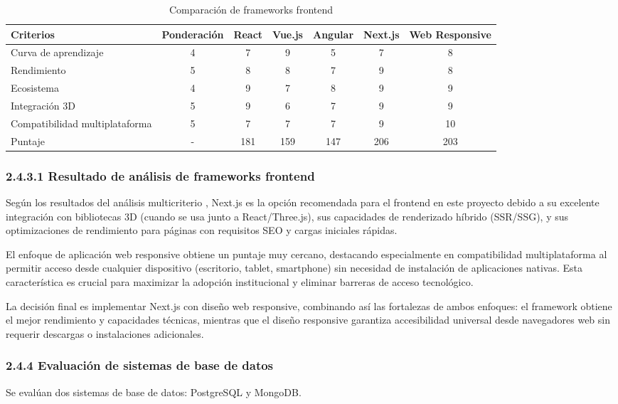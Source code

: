 \begin{table}[ht]
\centering
\caption{Comparación de frameworks frontend}
\begin{tabular}{l c c c c c c}
\hline
Criterios & Ponderación & React & Vue.js & Angular & Next.js & Web Responsive \\
\hline
Curva de aprendizaje & 4 & 7 & 9 & 5 & 7 & 8 \\
Rendimiento & 5 & 8 & 8 & 7 & 9 & 8 \\
Ecosistema & 4 & 9 & 7 & 8 & 9 & 9 \\
Integración 3D & 5 & 9 & 6 & 7 & 9 & 9 \\
Compatibilidad multiplataforma & 5 & 7 & 7 & 7 & 9 & 10 \\
\hline
Puntaje & - & 181 & 159 & 147 & 206 & 203 \\
\hline
\end{tabular}
\end{table}
\FloatBarrier
\subsubsection{2.4.3.1 Resultado de análisis de frameworks frontend}
Según los resultados del análisis multicriterio \cite{belton2002}, Next.js \cite{nextjs_docs2024} es la opción recomendada para el frontend en este proyecto debido a su excelente integración con bibliotecas 3D (cuando se usa junto a React/Three.js), sus capacidades de renderizado híbrido (SSR/SSG), y sus optimizaciones de rendimiento para páginas con requisitos SEO y cargas iniciales rápidas.

El enfoque de aplicación web responsive obtiene un puntaje muy cercano, destacando especialmente en compatibilidad multiplataforma al permitir acceso desde cualquier dispositivo (escritorio, tablet, smartphone) sin necesidad de instalación de aplicaciones nativas. Esta característica es crucial para maximizar la adopción institucional y eliminar barreras de acceso tecnológico.

La decisión final es implementar Next.js con diseño web responsive, combinando así las fortalezas de ambos enfoques: el framework obtiene el mejor rendimiento y capacidades técnicas, mientras que el diseño responsive garantiza accesibilidad universal desde navegadores web sin requerir descargas o instalaciones adicionales.

\subsubsection{2.4.4 Evaluación de sistemas de base de datos}
Se evalúan dos sistemas de base de datos: PostgreSQL y MongoDB.

